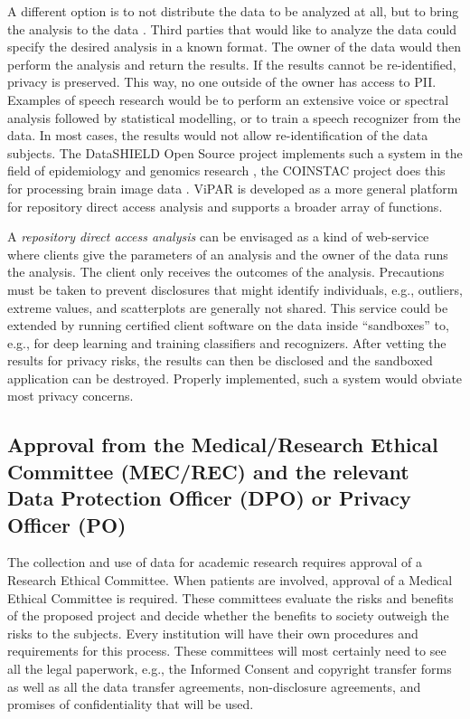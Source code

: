 \documentclass[10pt, a4paper]{article}
\begin{document}
A different option is to not distribute the data to be analyzed at all, but to bring the analysis to the data \cite{budin2015datashield,DataSHIELD2014}. Third parties that would like to analyze the data could specify the desired analysis in a known format. The owner of the data would then perform the analysis and return the results. If the results cannot be re-identified, privacy is preserved. This way, no one outside of the owner has access to PII. Examples of speech research would be to perform an extensive voice or spectral analysis followed by statistical modelling, or to train a speech recognizer from the data. In most cases, the results would not allow re-identification of the data subjects. The DataSHIELD Open Source project implements such a system in the field of epidemiology and genomics research \cite{DataSHIELD,DataSHIELD2014,wilson2017datashield,budin2015datashield}, the COINSTAC project does this for processing brain image data \cite{plis2016coinstac}. ViPAR \cite{carter2016vipar} is developed as a more general platform for repository direct access analysis and supports a broader array of functions.

A {\em repository direct access analysis} can be envisaged as a kind of web-service where clients give the parameters of an analysis and the owner of the data runs the analysis. The client only receives the outcomes of the analysis. Precautions must be taken to prevent disclosures that might identify individuals, e.g., outliers, extreme values, and scatterplots are generally not shared. This service could be extended by running certified client software on the data inside ``sandboxes'' to, e.g., for deep learning and training classifiers and recognizers. After vetting the results for privacy risks, the results can then be disclosed and the sandboxed application can be destroyed. Properly implemented, such a system would obviate most privacy concerns.

\subsection{Approval from the Medical/Research Ethical Committee (MEC/REC) and the relevant Data Protection Officer (DPO) or Privacy Officer (PO)}

The collection and use of data for academic research requires approval of a Research Ethical Committee. When patients are involved, approval of a Medical Ethical Committee is required. These committees evaluate the risks and benefits of the proposed project and decide whether the benefits to society outweigh the risks to the subjects. Every institution will have their own procedures and requirements for this process. These committees will most certainly need to see all the legal paperwork, e.g., the Informed Consent and copyright transfer forms as well as all the data transfer agreements, non-disclosure agreements, and promises of confidentiality that will be used.
\end{document}
